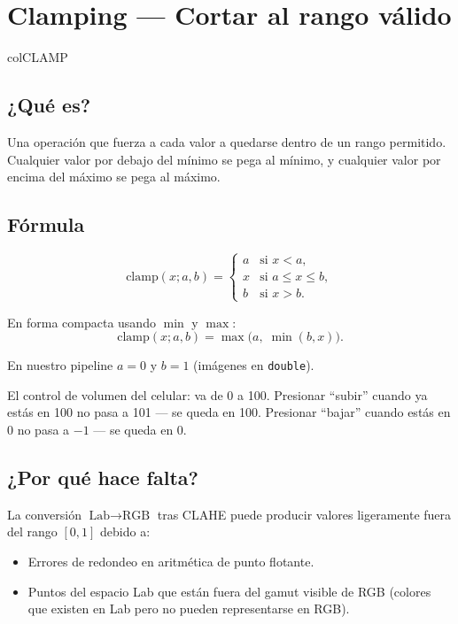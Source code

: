 \documentclass[11pt,a4paper]{article}
\begin{document}
\section{\textcolor{colCLAMP}{Clamping} — Cortar al rango válido}
\begin{keybox}{colCLAMP}

\subsection*{¿Qué es?}

Una operación que fuerza a cada valor a quedarse dentro de un rango permitido.
Cualquier valor por debajo del mínimo se pega al mínimo, y cualquier valor
por encima del máximo se pega al máximo.

\subsection*{Fórmula}

\begin{equation}
    \text{clamp}(x; a, b) =
    \begin{cases}
        a & \text{si } x < a, \\
        x & \text{si } a \le x \le b, \\
        b & \text{si } x > b.
    \end{cases}
\end{equation}

En forma compacta usando \(\min\) y \(\max\):
\begin{equation}
    \text{clamp}(x; a, b) = \max\!\bigl(a,\; \min(b, x)\bigr).
\end{equation}

En nuestro pipeline \(a = 0\) y \(b = 1\) (imágenes en \texttt{double}).

\begin{analogy}
El control de volumen del celular: va de 0 a 100. Presionar ``subir'' cuando
ya estás en 100 no pasa a 101 — se queda en 100. Presionar ``bajar'' cuando
estás en 0 no pasa a \(-1\) — se queda en 0.
\end{analogy}

\subsection*{¿Por qué hace falta?}

La conversión \(\text{Lab} \to \text{RGB}\) tras CLAHE puede producir valores
ligeramente fuera del rango \([0, 1]\) debido a:
\begin{itemize}
    \item Errores de redondeo en aritmética de punto flotante.
    \item Puntos del espacio Lab que están fuera del gamut visible de RGB (colores
          que existen en Lab pero no pueden representarse en RGB).
\end{itemize}


\end{keybox}
\end{document}

